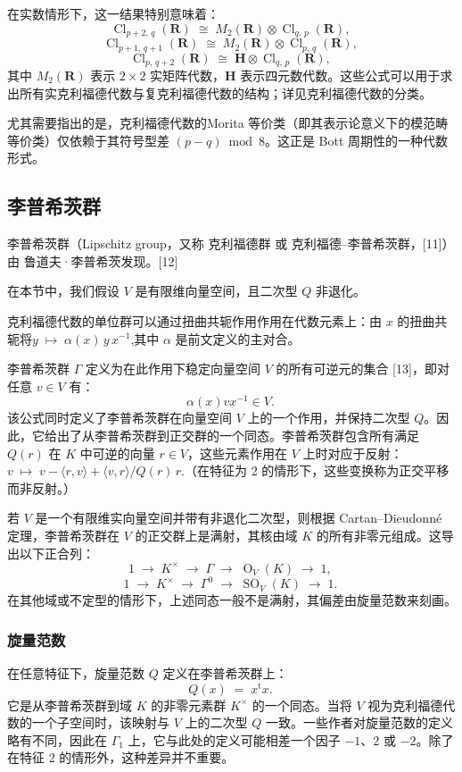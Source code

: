 在实数情形下，这一结果特别意味着：
$$
\operatorname{Cl}_{p+2,\,q}(\mathbf{R}) \;\cong\; M_2(\mathbf{R}) \otimes \operatorname{Cl}_{q,\,p}(\mathbf{R}),~
$$
$$
\operatorname{Cl}_{p+1,\,q+1}(\mathbf{R}) \;\cong\; M_2(\mathbf{R}) \otimes \operatorname{Cl}_{p,\,q}(\mathbf{R}),~
$$
$$
\operatorname{Cl}_{p,\,q+2}(\mathbf{R}) \;\cong\; \mathbf{H} \otimes \operatorname{Cl}_{q,\,p}(\mathbf{R}),~
$$
其中 $M_2(\mathbf{R})$ 表示 $2 \times 2$ 实矩阵代数，$\mathbf{H}$ 表示四元数代数。这些公式可以用于求出所有实克利福德代数与复克利福德代数的结构；详见克利福德代数的分类。

尤其需要指出的是，克利福德代数的Morita 等价类（即其表示论意义下的模范畴等价类）仅依赖于其符号型差 $(p - q) \bmod 8$。这正是 Bott 周期性的一种代数形式。
\subsection{李普希茨群}
李普希茨群（Lipschitz group，又称 克利福德群 或 克利福德–李普希茨群，[11]）由 鲁道夫·李普希茨发现。[12]

在本节中，我们假设 $V$ 是有限维向量空间，且二次型 $Q$ 非退化。

克利福德代数的单位群可以通过扭曲共轭作用作用在代数元素上：由 $x$ 的扭曲共轭将$y \;\mapsto\; \alpha(x)\, y\, x^{-1}$,其中 $\alpha$ 是前文定义的主对合。

李普希茨群 $\Gamma$ 定义为在此作用下稳定向量空间 $V$ 的所有可逆元的集合 [13]，即对任意 $v \in V$ 有：
$$
\alpha(x) v x^{-1} \in V.~
$$
该公式同时定义了李普希茨群在向量空间 $V$ 上的一个作用，并保持二次型 $Q$。因此，它给出了从李普希茨群到正交群的一个同态。李普希茨群包含所有满足 $Q(r)$ 在 $K$ 中可逆的向量 $r \in V$，这些元素作用在 $V$ 上时对应于反射：$v \;\mapsto\; v - \langle r, v \rangle + \langle v, r \rangle/Q(r)\, r$.（在特征为 2 的情形下，这些变换称为正交平移而非反射。）

若 $V$ 是一个有限维实向量空间并带有非退化二次型，则根据 Cartan–Dieudonné 定理，李普希茨群在 $V$ 的正交群上是满射，其核由域 $K$ 的所有非零元组成。这导出以下正合列：
$$
1 \;\longrightarrow\; K^{\times} \;\longrightarrow\; \Gamma \;\longrightarrow\; \operatorname{O}_V(K) \;\longrightarrow\; 1,~
$$
$$
1 \;\longrightarrow\; K^{\times} \;\longrightarrow\; \Gamma^{0} \;\longrightarrow\; \operatorname{SO}_V(K) \;\longrightarrow\; 1.~
$$
在其他域或不定型的情形下，上述同态一般不是满射，其偏差由旋量范数来刻画。
\subsubsection{旋量范数}
在任意特征下，旋量范数 $Q$ 定义在李普希茨群上：
$$
Q(x) \;=\; x^{\mathrm{t}}x .~
$$
它是从李普希茨群到域 $K$ 的非零元素群 $K^{\times}$ 的一个同态。当将 $V$ 视为克利福德代数的一个子空间时，该映射与 $V$ 上的二次型 $Q$ 一致。一些作者对旋量范数的定义略有不同，因此在 $\Gamma_{1}$ 上，它与此处的定义可能相差一个因子 $-1$、$2$ 或 $-2$。除了在特征 2 的情形外，这种差异并不重要。

